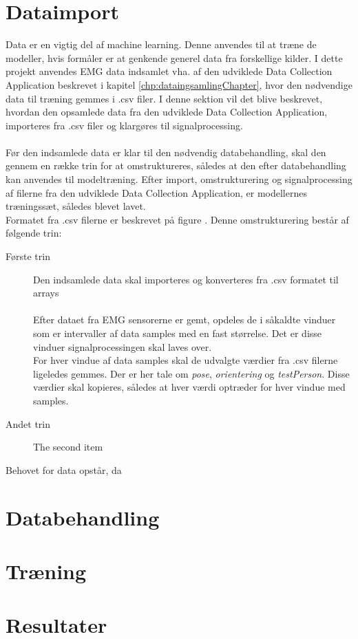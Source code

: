 \section{Dataimport}
Data er en vigtig del af machine learning. Denne anvendes til at træne de modeller, hvis formåler er at genkende generel data fra forskellige kilder. I dette projekt anvendes EMG data indsamlet vha. af den udviklede Data Collection Application beskrevet i kapitel \ref{chp:dataingsamlingChapter}, hvor den nødvendige data til træning gemmes i .csv filer. I denne sektion vil det blive beskrevet, hvordan den opsamlede data fra den udviklede Data Collection Application, importeres fra .csv filer og klargøres til signalprocessing.
\\\\
Før den indsamlede data er klar til den nødvendig databehandling, skal den gennem en række trin for at omstruktureres, således at den efter databehandling kan anvendes til modeltræning. Efter import, omstrukturering og signalprocessing af filerne fra den udviklede Data Collection Application, er modellernes træningssæt, således blevet lavet. 
\\
Formatet fra .csv filerne er beskrevet på figure . 
Denne omstrukturering består af følgende trin:
\begin{description}
	\item[Første trin] Den indsamlede data skal importeres og konverteres fra .csv formatet til arrays\\\\
	Efter dataet fra EMG sensorerne er gemt, opdeles de i såkaldte vinduer som er intervaller af data samples med en fast størrelse. Det er disse vinduer signalprocessingen skal laves over.
	\\
	For hver vindue af data samples skal de udvalgte værdier fra .csv filerne ligeledes gemmes. Der er her tale om \textit{pose}, \textit{orientering} og \textit{testPerson}. Disse værdier skal kopieres, således at hver værdi optræder for hver vindue med samples.
	

  
  \item[Andet trin] The second item
\end{description}



 Behovet for data opstår, da 


\section{Databehandling}

\section{Træning}

\section{Resultater}